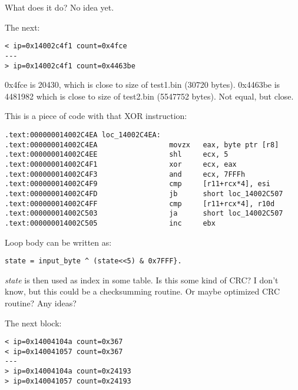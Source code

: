 What does it do? No idea yet.

The next:

\begin{lstlisting}
< ip=0x14002c4f1 count=0x4fce
---
> ip=0x14002c4f1 count=0x4463be
\end{lstlisting}

0x4fce is 20430, which is close to size of test1.bin (30720 bytes).
0x4463be is 4481982 which is close to size of test2.bin (5547752 bytes).
Not equal, but close.

This is a piece of code with that XOR instruction:

\begin{lstlisting}
.text:000000014002C4EA loc_14002C4EA:
.text:000000014002C4EA                 movzx   eax, byte ptr [r8]
.text:000000014002C4EE                 shl     ecx, 5
.text:000000014002C4F1                 xor     ecx, eax
.text:000000014002C4F3                 and     ecx, 7FFFh
.text:000000014002C4F9                 cmp     [r11+rcx*4], esi
.text:000000014002C4FD                 jb      short loc_14002C507
.text:000000014002C4FF                 cmp     [r11+rcx*4], r10d
.text:000000014002C503                 ja      short loc_14002C507
.text:000000014002C505                 inc     ebx
\end{lstlisting}

Loop body can be written as:

\begin{lstlisting}
state = input_byte ^ (state<<5) & 0x7FFF}.
\end{lstlisting}

\emph{state} is then used as index in some table. Is this some kind of \ac{CRC}? I don't know, but this could be a checksumming routine.
Or maybe optimized \ac{CRC} routine?
Any ideas?

The next block:

\begin{lstlisting}
< ip=0x14004104a count=0x367
< ip=0x140041057 count=0x367
---
> ip=0x14004104a count=0x24193
> ip=0x140041057 count=0x24193
\end{lstlisting}

